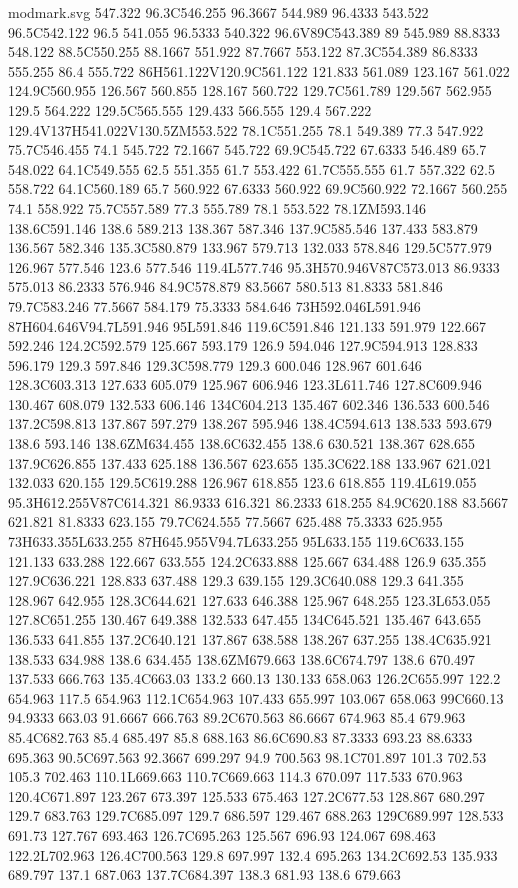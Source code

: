 \begin{filecontents}[noheader]{modmark.svg}
547.322 96.3C546.255 96.3667 544.989 96.4333 543.522 96.5C542.122 96.5 541.055 96.5333 540.322 96.6V89C543.389 89 545.989 88.8333 548.122 88.5C550.255 88.1667 551.922 87.7667 553.122 87.3C554.389 86.8333 555.255 86.4 555.722 86H561.122V120.9C561.122 121.833 561.089 123.167 561.022 124.9C560.955 126.567 560.855 128.167 560.722 129.7C561.789 129.567 562.955 129.5 564.222 129.5C565.555 129.433 566.555 129.4 567.222 129.4V137H541.022V130.5ZM553.522 78.1C551.255 78.1 549.389 77.3 547.922 75.7C546.455 74.1 545.722 72.1667 545.722 69.9C545.722 67.6333 546.489 65.7 548.022 64.1C549.555 62.5 551.355 61.7 553.422 61.7C555.555 61.7 557.322 62.5 558.722 64.1C560.189 65.7 560.922 67.6333 560.922 69.9C560.922 72.1667 560.255 74.1 558.922 75.7C557.589 77.3 555.789 78.1 553.522 78.1ZM593.146 138.6C591.146 138.6 589.213 138.367 587.346 137.9C585.546 137.433 583.879 136.567 582.346 135.3C580.879 133.967 579.713 132.033 578.846 129.5C577.979 126.967 577.546 123.6 577.546 119.4L577.746 95.3H570.946V87C573.013 86.9333 575.013 86.2333 576.946 84.9C578.879 83.5667 580.513 81.8333 581.846 79.7C583.246 77.5667 584.179 75.3333 584.646 73H592.046L591.946 87H604.646V94.7L591.946 95L591.846 119.6C591.846 121.133 591.979 122.667 592.246 124.2C592.579 125.667 593.179 126.9 594.046 127.9C594.913 128.833 596.179 129.3 597.846 129.3C598.779 129.3 600.046 128.967 601.646 128.3C603.313 127.633 605.079 125.967 606.946 123.3L611.746 127.8C609.946 130.467 608.079 132.533 606.146 134C604.213 135.467 602.346 136.533 600.546 137.2C598.813 137.867 597.279 138.267 595.946 138.4C594.613 138.533 593.679 138.6 593.146 138.6ZM634.455 138.6C632.455 138.6 630.521 138.367 628.655 137.9C626.855 137.433 625.188 136.567 623.655 135.3C622.188 133.967 621.021 132.033 620.155 129.5C619.288 126.967 618.855 123.6 618.855 119.4L619.055 95.3H612.255V87C614.321 86.9333 616.321 86.2333 618.255 84.9C620.188 83.5667 621.821 81.8333 623.155 79.7C624.555 77.5667 625.488 75.3333 625.955 73H633.355L633.255 87H645.955V94.7L633.255 95L633.155 119.6C633.155 121.133 633.288 122.667 633.555 124.2C633.888 125.667 634.488 126.9 635.355 127.9C636.221 128.833 637.488 129.3 639.155 129.3C640.088 129.3 641.355 128.967 642.955 128.3C644.621 127.633 646.388 125.967 648.255 123.3L653.055 127.8C651.255 130.467 649.388 132.533 647.455 134C645.521 135.467 643.655 136.533 641.855 137.2C640.121 137.867 638.588 138.267 637.255 138.4C635.921 138.533 634.988 138.6 634.455 138.6ZM679.663 138.6C674.797 138.6 670.497 137.533 666.763 135.4C663.03 133.2 660.13 130.133 658.063 126.2C655.997 122.2 654.963 117.5 654.963 112.1C654.963 107.433 655.997 103.067 658.063 99C660.13 94.9333 663.03 91.6667 666.763 89.2C670.563 86.6667 674.963 85.4 679.963 85.4C682.763 85.4 685.497 85.8 688.163 86.6C690.83 87.3333 693.23 88.6333 695.363 90.5C697.563 92.3667 699.297 94.9 700.563 98.1C701.897 101.3 702.53 105.3 702.463 110.1L669.663 110.7C669.663 114.3 670.097 117.533 670.963 120.4C671.897 123.267 673.397 125.533 675.463 127.2C677.53 128.867 680.297 129.7 683.763 129.7C685.097 129.7 686.597 129.467 688.263 129C689.997 128.533 691.73 127.767 693.463 126.7C695.263 125.567 696.93 124.067 698.463 122.2L702.963 126.4C700.563 129.8 697.997 132.4 695.263 134.2C692.53 135.933 689.797 137.1 687.063 137.7C684.397 138.3 681.93 138.6 679.663 
\end{filecontents}
